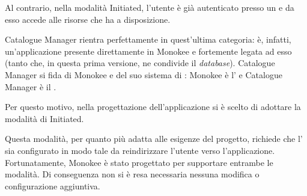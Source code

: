 Al contrario, nella modalità  Initiated, l'utente è già autenticato presso un  e da esso accede alle risorse che ha a disposizione. 

Catalogue Manager rientra perfettamente in quest'ultima categoria: è, infatti, un'applicazione presente direttamente in Monokee e fortemente legata ad esso (tanto che, in questa prima versione, ne condivide il \textit{database}). Catalogue Manager si fida di Monokee e del suo sistema di : Monokee è l' e Catalogue Manager è il . 

Per questo motivo, nella progettazione dell'applicazione si è scelto di adottare la modalità di   Initiated. 

Questa modalità, per quanto più adatta alle esigenze del progetto, richiede che l' sia configurato in modo tale da reindirizzare l'utente verso l'applicazione. Fortunatamente, Monokee è stato progettato per supportare entrambe le modalità. Di conseguenza non si è resa necessaria nessuna modifica o configurazione aggiuntiva. 